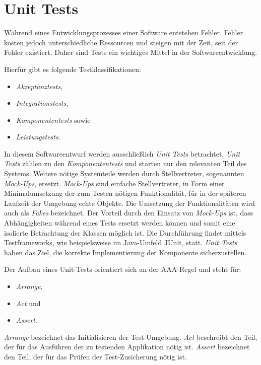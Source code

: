 \chapter{Unit Tests}
Während eines Entwicklungsprozesses einer Software entstehen Fehler.
Fehler kosten jedoch unterschiedliche Ressourcen und steigen mit der Zeit, seit der Fehler existiert.
Daher sind Tests ein wichtiges Mittel in der Softwareentwicklung.

Hierfür gibt es folgende Testklassifikationen:
\begin{itemize}
    \item \textit{Akzeptanztests},
    \item \textit{Integrationstests},
    \item \textit{Komponententests} sowie
    \item \textit{Leistungstests}.
\end{itemize}

In diesem Softwareentwurf werden ausschließlich \textit{Unit Tests} betrachtet.
\textit{Unit Tests} zählen zu den \textit{Komponententests} und starten nur den relevanten Teil des Systems.
Weitere nötige Systemteile werden durch Stellvertreter, sogenannten \textit{Mock-Ups}, ersetzt.
\textit{Mock-Ups} sind einfache Stellvertreter, in Form einer Minimalumsetzung der zum Testen nötigen Funktionalität, für in der späteren Laufzeit der Umgebung \glqq echte\grqq{} Objekte.
Die Umsetzung der Funktionalitäten wird auch als \textit{Fakes} bezeichnet.
Der Vorteil durch den Einsatz von \textit{Mock-Ups} ist, dass Abhängigkeiten während eines Tests ersetzt werden können und somit eine isolierte Betrachtung der Klassen möglich ist.
Die Durchführung findet mittels Testframeworks, wie beispielsweise im Java-Umfeld JUnit, statt.
\textit{Unit Tests} haben das Ziel, die korrekte Implementierung der Komponente sicherzustellen.

Der Aufbau eines Unit-Tests orientiert sich an der AAA-Regel und steht für:
\begin{itemize}
    \item \textit{Arrange},
    \item \textit{Act} und
    \item \textit{Assert}.
\end{itemize}

\textit{Arrange} bezeichnet das Initialisieren der Test-Umgebung.
\textit{Act} beschreibt den Teil, der für das Ausführen der zu testenden Applikation nötig ist.
\textit{Assert} bezeichnet den Teil, der für das Prüfen der Test-Zusicherung nötig ist.

